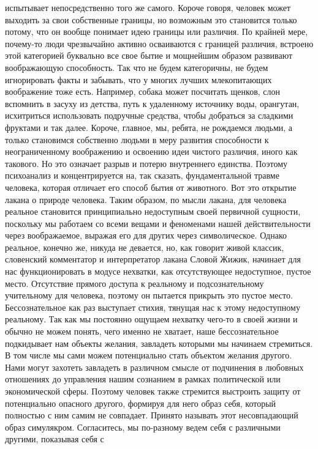 испытывает непосредственно того же самого. Короче говоря, человек может выходить
за свои собственные границы, но возможным это становится только потому, что он
вообще понимает идею границы или различия. По крайней мере, почему-то люди
чрезвычайно активно осваиваются с границей различия, встроено этой категорией
буквально все свое бытие и мощнейшим образом развивают воображающую способность.
Так что не будем категоричны, не будем игнорировать факты и забывать, что у
многих лучших млекопитающих воображение тоже есть. Например, собака может
посчитать щенков, слон вспомнить в засуху из детства, путь к удаленному
источнику воды, орангутан, исхитриться использовать подручные средства, чтобы
добраться за сладкими фруктами и так далее. Короче, главное, мы, ребята, не
рождаемся людьми, а только становимся собственно людьми в меру развития
способности к неограниченному воображению и освоению идеи чистого различия,
иного как такового. Но это означает разрыв и потерю внутреннего единства.
Поэтому психоанализ и концентрируется на, так сказать, фундаментальной травме
человека, которая отличает его способ бытия от животного. Вот это открытие
лакана о природе человека. Таким образом, по мысли лакана, для человека реальное
становится принципиально недоступным своей первичной сущности, поскольку мы
работаем со всеми вещами и феноменами нашей действительности через воображаемое,
выражая его для других через символическое. Однако реальное, конечно же, никуда
не девается, но, как говорит живой классик, словенский комментатор и
интерпретатор лакана Словой Жижик, начинает для нас функционировать в модусе
нехватки, как отсутствующее недоступное, пустое место. Отсутствие прямого
доступа к реальному и подсознательному учительному для человека, поэтому он
пытается прикрыть это пустое место. Бессознательное как раз выступает стихия,
тянущая нас к этому недоступному реальному. Так как мы постоянно ощущаем
нехватку чего-то в своей жизни и обычно не можем понять, чего именно не хватает,
наше бессознательное подкидывает нам объекты желания, завладеть которыми мы
начинаем стремиться. В том числе мы сами можем потенциально стать объектом
желания другого. Нами могут захотеть завладеть в различном смысле от подчинения
в любовных отношениях до управления нашим сознанием в рамках политической или
экономической сферы. Поэтому человек также стремится выстроить защиту от
потенциально опасного другого, формируя для него образ себя, который полностью с
ним самим не совпадает. Принято называть этот несовпадающий образ симулякром.
Согласитесь, мы по-разному ведем себя с различными другими, показывая себя с
